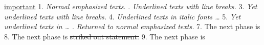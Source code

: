 \documentclass[11pt,a4paper]{article}
\begin{document}
\underline{important}
1. {\em Normal emphasized texts.}
. {\em Underlined texts with line breaks.}
3. \emph{Yet underlined texts with line breaks.}
4. {\it{\em Underlined texts in italic fonts …}}
5. \textit{\emph{Yet underlined texts in …}}
. {\em Returned to normal emphasized texts.}
7. The next phase is 
8. The next phase is \sout{striked out statement.}
9. The next phase is 
\end{document}
